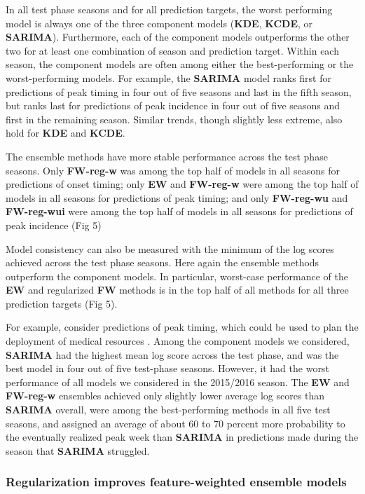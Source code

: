 \documentclass[10pt,letterpaper]{article}
\begin{document}
In all test phase seasons and for all prediction targets, the worst
performing model is always one of the three component models
(\textbf{KDE}, \textbf{KCDE}, or \textbf{SARIMA}). Furthermore, each of
the component models outperforms the other two for at least one
combination of season and prediction target. Within each season, the
component models are often among either the best-performing or the
worst-performing models. For example, the \textbf{SARIMA} model ranks
first for predictions of peak timing in four out of five seasons and
last in the fifth season, but ranks last for predictions of peak
incidence in four out of five seasons and first in the remaining season.
Similar trends, though slightly less extreme, also hold for \textbf{KDE}
and \textbf{KCDE}.

The ensemble methods have more stable performance across the test phase
seasons. Only \textbf{FW-reg-w} was among the top half of models in all
seasons for predictions of onset timing; only \textbf{EW} and
\textbf{FW-reg-w} were among the top half of models in all seasons for
predictions of peak timing; and only \textbf{FW-reg-wu} and
\textbf{FW-reg-wui} were among the top half of models in all seasons for
predictions of peak incidence (Fig 5)

Model consistency can also be measured with the minimum of the log
scores achieved across the test phase seasons. Here again the ensemble
methods outperform the component models. In particular, worst-case
performance of the \textbf{EW} and regularized \textbf{FW} methods is in
the top half of all methods for all three prediction targets (Fig 5).

For example, consider predictions of peak timing, which could be used to
plan the deployment of medical resources \cite{cdc-decisions-2016}.
Among the component models we considered, \textbf{SARIMA} had the
highest mean log score across the test phase, and was the best model in
four out of five test-phase seasons. However, it had the worst
performance of all models we considered in the 2015/2016 season. The
\textbf{EW} and \textbf{FW-reg-w} ensembles achieved only slightly lower
average log scores than \textbf{SARIMA} overall, were among the
best-performing methods in all five test seasons, and assigned an
average of about 60 to 70 percent more probability to the eventually
realized peak week than \textbf{SARIMA} in predictions made during the
season that \textbf{SARIMA} struggled.

\subsubsection{Regularization improves feature-weighted ensemble
models}\label{regularization-improves-feature-weighted-ensemble-models}
\end{document}
